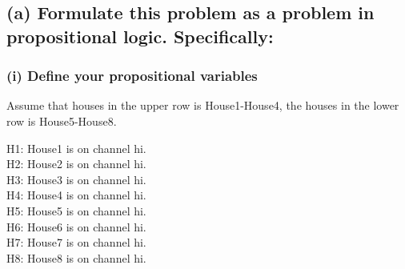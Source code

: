 \documentclass[]{article}
\begin{document}
\begin{spacing}{1.5}
		\subsection*{(a) Formulate this problem as a problem in propositional logic. Specifically:}
		\subsubsection*{(i) Define your propositional variables}
		Assume that houses in the upper row is House1-House4, the houses in the lower row is House5-House8.\\
		\begin{center}
			H1:  House1 is on channel hi.\\
			H2: House2 is on channel hi.\\
			H3: House3 is on channel hi.\\
			H4: House4 is on channel hi.\\
			H5: House5 is on channel hi.\\
			H6: House6 is on channel hi.\\
			H7: House7 is on channel hi.\\
			H8: House8 is on channel hi.
		\end{center}
		
		

\end{spacing}
\end{document}
